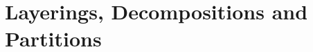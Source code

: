 \documentclass{patmorin}
\newcommand{\notex}[2]{}
\begin{document}









\section{Layerings, Decompositions and Partitions}
\label{Tools}
\end{document}
